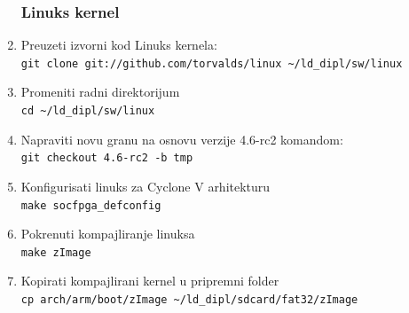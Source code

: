 \begin{enumerate}
\subsubsection{Linuks kernel}
\item Preuzeti izvorni kod Linuks kernela:\\
\texttt{git clone git://github.com/torvalds/linux \textasciitilde/ld\_dipl/sw/linux}
\item Promeniti radni direktorijum\\
\texttt{cd \textasciitilde/ld\_dipl/sw/linux}
\item Napraviti novu granu na osnovu verzije 4.6-rc2 komandom:\\ \texttt{git checkout 4.6-rc2 -b tmp}
\item Konfigurisati linuks za Cyclone V arhitekturu\\
\texttt{make socfpga\_defconfig}
\item Pokrenuti kompajliranje linuksa\\
\texttt{make zImage}
\item Kopirati kompajlirani kernel u pripremni folder\\
\texttt{cp arch/arm/boot/zImage \textasciitilde/ld\_dipl/sdcard/fat32/zImage}



\end{enumerate}
